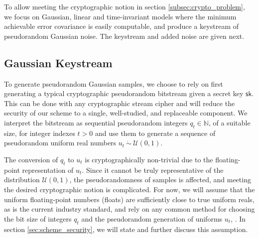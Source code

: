 \documentclass[letterpaper, 10 pt, conference]{ieeeconf}
\begin{document}
To allow meeting the cryptographic notion in section \mbox{\ref{subsec:crypto_problem}}, we focus on Gaussian, linear and time-invariant models where the minimum achievable error covariance is easily computable, and produce a keystream of pseudorandom Gaussian noise. The keystream and added noise are given next.

% 
% 

\subsection{Gaussian Keystream}\label{subsec:gaussian_keystream}
To generate pseudorandom Gaussian samples, we choose to rely on first generating a typical cryptographic pseudorandom bitstream given a secret key $\mathsf{sk}$. This can be done with any cryptographic stream cipher and will reduce the security of our scheme to a single, well-studied, and replaceable component. We interpret the bitstream as sequential pseudorandom integers $q_t \in \mathbb{N}$, of a suitable size, for integer indexes $t>0$ and use them to generate a sequence of pseudorandom uniform real numbers $u_t\ \dot{\sim}\ \mathcal{U}(0,1)$.

The conversion of $q_t$ to $u_t$ is cryptographically non-trivial due to the floating-point representation of $u_t$. Since it cannot be truly representative of the distribution $\mathcal{U}(0,1)$, the pseudorandomness of samples is affected, and meeting the desired cryptographic notion is complicated. For now, we will assume that the uniform floating-point numbers (floats) are sufficiently close to true uniform reals, as is the current industry standard, and rely on any common method for choosing the bit size of integers $q_t$ and the pseudorandom generation of uniforms $u_t$, \cite{goualardGeneratingRandomFloatingPoint2020}. In section \ref{sec:scheme_security}, we will state and further discuss this assumption.
\end{document}
